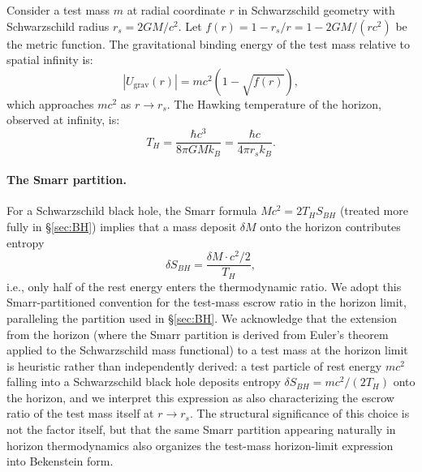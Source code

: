 \documentclass[11pt]{article}
\begin{document}
Consider a test mass $m$ at radial coordinate $r$ in Schwarzschild geometry with Schwarzschild radius $r_s = 2GM/c^2$. Let $f(r) = 1 - r_s/r = 1 - 2GM/(rc^2)$ be the metric function. The gravitational binding energy of the test mass relative to spatial infinity is:
\begin{equation}
|U_{\mathrm{grav}}(r)| = mc^2\left(1 - \sqrt{f(r)}\right),
\label{eq:Ugrav_test}
\end{equation}
which approaches $mc^2$ as $r \to r_s$. The Hawking temperature \cite{Hawking1975} of the horizon, observed at infinity, is:
\begin{equation}
T_H = \frac{\hbar c^3}{8\pi G M k_B} = \frac{\hbar c}{4\pi r_s k_B}.
\end{equation}

\paragraph{The Smarr partition.} For a Schwarzschild black hole, the Smarr formula $Mc^2 = 2 T_H S_{BH}$ (treated more fully in \S\ref{sec:BH}) implies that a mass deposit $\delta M$ onto the horizon contributes entropy
\begin{equation}
\delta S_{BH} = \frac{\delta M \cdot c^2/2}{T_H},
\end{equation}
i.e., only half of the rest energy enters the thermodynamic ratio. We adopt this Smarr-partitioned convention for the test-mass escrow ratio in the horizon limit, paralleling the partition used in \S\ref{sec:BH}. We acknowledge that the extension from the horizon (where the Smarr partition is derived from Euler's theorem applied to the Schwarzschild mass functional) to a test mass at the horizon limit is heuristic rather than independently derived: a test particle of rest energy $mc^2$ falling into a Schwarzschild black hole deposits entropy $\delta S_{BH} = mc^2/(2 T_H)$ onto the horizon, and we interpret this expression as also characterizing the escrow ratio of the test mass itself at $r \to r_s$. The structural significance of this choice is not the factor itself, but that the same Smarr partition appearing naturally in horizon thermodynamics also organizes the test-mass horizon-limit expression into Bekenstein form.
\end{document}
